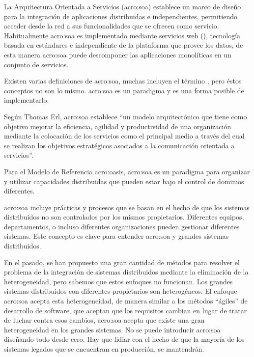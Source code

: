 La Arquitectura Orientada a Servicios (\gls{acro:soa}) establece un marco de diseño para la integración de aplicaciones distribuidas e independientes, permitiendo acceder desde la red a sus funcionalidades que se ofrecen como servicio. Habitualmente \gls{acro:soa} es implementado mediante servicios web (), tecnología basada en estándares e independiente de la plataforma que provee los datos, de esta manera \gls{acro:soa} puede descomponer las aplicaciones monolíticas en un conjunto de servicios\cite{microsoft2006}.

Existen varias definiciones de \gls{acro:soa}, muchas incluyen el término , pero éstos conceptos no son lo mismo. \gls{acro:soa} es un paradigma y  es una forma posible de implementarlo.

Según Thomas Erl\cite{principlesofdesign:erl}, \gls{acro:soa} establece ``un modelo arquitectónico que tiene como objetivo mejorar la eficiencia, agilidad y productividad de una organización mediante la colocación de los servicios como el principal medio a través del cual se realizan los objetivos estratégicos asociados a la comunicación orientada a servicios''.

Para el Modelo de Referencia \gls{acro:oasis}, \gls{acro:soa} es un paradigma para organizar y utilizar capacidades distribuidas que pueden estar bajo el control de dominios diferentes.

\gls{acro:soa} incluye prácticas y procesos que se basan en el hecho de que los sistemas distribuidos no son controlados por los mismos propietarios. Diferentes equipos, departamentos, o incluso diferentes organizaciones pueden gestionar diferentes sistemas. Este concepto es clave para entender \gls{acro:soa} y grandes sistemas distribuidos.

En el pasado, se han propuesto una gran cantidad de métodos para resolver el problema de la integración de sistemas distribuidos mediante la eliminación de la heterogeneidad, pero sabemos que estos enfoques no funcionan. Los grandes sistemas distribuidos con diferentes propietarios son heterogéneos.  El enfoque \gls{acro:soa} acepta esta heterogeneidad, de manera similar a los métodos ``ágiles'' de desarrollo de software, que aceptan que los requisitos cambian en lugar de tratar de luchar contra esos cambios, \gls{acro:soa} acepta que existe una gran heterogeneidad en los grandes sistemas. No se puede introducir \gls{acro:soa} diseñando todo desde cero. Hay que lidiar con el hecho de que la mayoría de los sistemas legados que se encuentran en producción, se mantendrán\cite[p.~15]{josuttis2007}.
